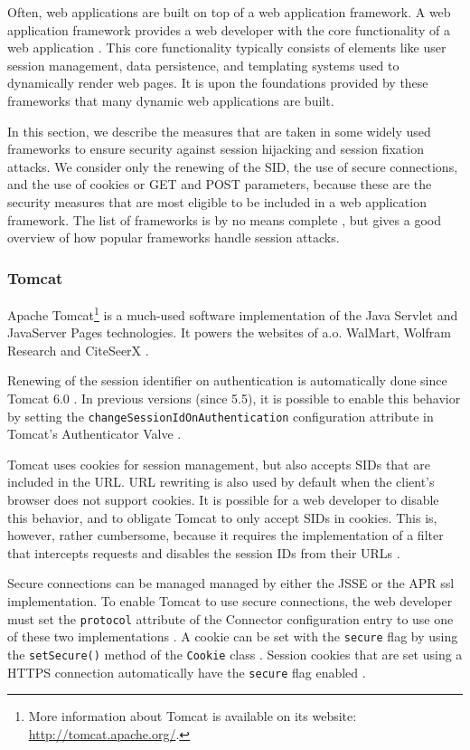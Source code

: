 Often, web applications are built on top of a web application framework. A \gls{web application framework} provides a web developer with the core functionality of a web application \cite{Schwartz2010}. This core functionality typically consists of elements like user session management, data persistence, and templating systems used to dynamically render web pages. It is upon the foundations provided by these frameworks that many dynamic web applications are built.

In this section, we describe the measures that are taken in some widely used frameworks to ensure security against session hijacking and session fixation attacks. We consider only the renewing of the SID, the use of secure connections, and the use of cookies or GET and POST parameters, because these are the security measures that are most eligible to be included in a web application framework. The list of frameworks is by no means complete \cite{FrameworksComparison}, but gives a good overview of how popular frameworks handle session attacks.

\subsubsection{Tomcat}

Apache Tomcat\footnote{More information about Tomcat is available on its website: \url{http://tomcat.apache.org/}.} is a much-used software implementation of the Java Servlet and JavaServer Pages technologies. It powers the websites of a.o. WalMart, Wolfram Research and CiteSeerX \cite{TomcatPoweredBy}.

Renewing of the session identifier on authentication is automatically done since Tomcat 6.0 \cite{TomcatAuthentication6}. In previous versions (since 5.5), it is possible to enable this behavior by setting the \texttt{changeSessionIdOnAuthentication} configuration attribute in Tomcat's Authenticator Valve \cite{TomcatAuthentication5}.

Tomcat uses cookies for session management, but also accepts SIDs that are included in the URL. URL rewriting is also used by default when the client's browser does not support cookies. It is possible for a web developer to disable this behavior, and to obligate Tomcat to only accept SIDs in cookies. This is, however, rather cumbersome, because it requires the implementation of a filter that intercepts requests and disables the session IDs from their URLs \cite{Condit2006}.

Secure connections can be managed managed by either the JSSE or the APR \gls{ssl} implementation. To enable Tomcat to use secure connections, the web developer must set the \texttt{protocol} attribute of the Connector configuration entry to use one of these two implementations \cite{TomcatSSL}. A cookie can be set with the \texttt{secure} flag by using the \texttt{setSecure()} method of the \texttt{Cookie} class \cite{TomcatCookie}. Session cookies that are set using a HTTPS connection automatically have the \texttt{secure} flag enabled \cite{Funk2004}.

